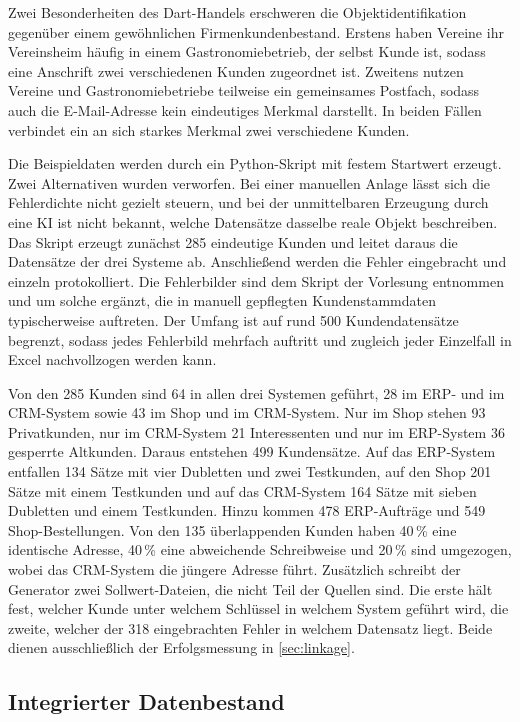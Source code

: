 \documentclass[a4paper,12pt]{article}
\begin{document}
Zwei Besonderheiten des Dart-Handels erschweren die Objektidentifikation gegenüber einem gewöhnlichen Firmenkundenbestand. Erstens haben Vereine ihr Vereinsheim häufig in einem Gastronomiebetrieb, der selbst Kunde ist, sodass eine Anschrift zwei verschiedenen Kunden zugeordnet ist. Zweitens nutzen Vereine und Gastronomiebetriebe teilweise ein gemeinsames Postfach, sodass auch die E-Mail-Adresse kein eindeutiges Merkmal darstellt. In beiden Fällen verbindet ein an sich starkes Merkmal zwei verschiedene Kunden.

Die Beispieldaten werden durch ein Python-Skript mit festem Startwert erzeugt. Zwei Alternativen wurden verworfen. Bei einer manuellen Anlage lässt sich die Fehlerdichte nicht gezielt steuern, und bei der unmittelbaren Erzeugung durch eine KI ist nicht bekannt, welche Datensätze dasselbe reale Objekt beschreiben. Das Skript erzeugt zunächst 285 eindeutige Kunden und leitet daraus die Datensätze der drei Systeme ab. Anschließend werden die Fehler eingebracht und einzeln protokolliert. Die Fehlerbilder sind dem Skript der Vorlesung entnommen und um solche ergänzt, die in manuell gepflegten Kundenstammdaten typischerweise auftreten. Der Umfang ist auf rund 500 Kundendatensätze begrenzt, sodass jedes Fehlerbild mehrfach auftritt und zugleich jeder Einzelfall in Excel nachvollzogen werden kann.

Von den 285 Kunden sind 64 in allen drei Systemen geführt, 28 im ERP- und im CRM-System sowie 43 im Shop und im CRM-System. Nur im Shop stehen 93 Privatkunden, nur im CRM-System 21 Interessenten und nur im ERP-System 36 gesperrte Altkunden. Daraus entstehen 499 Kundensätze. Auf das ERP-System entfallen 134 Sätze mit vier Dubletten und zwei Testkunden, auf den Shop 201 Sätze mit einem Testkunden und auf das CRM-System 164 Sätze mit sieben Dubletten und einem Testkunden. Hinzu kommen 478 ERP-Aufträge und 549 Shop-Bestellungen. Von den 135 überlappenden Kunden haben 40\,\% eine identische Adresse, 40\,\% eine abweichende Schreibweise und 20\,\% sind umgezogen, wobei das CRM-System die jüngere Adresse führt. Zusätzlich schreibt der Generator zwei Sollwert-Dateien, die nicht Teil der Quellen sind. Die erste hält fest, welcher Kunde unter welchem Schlüssel in welchem System geführt wird, die zweite, welcher der 318 eingebrachten Fehler in welchem Datensatz liegt. Beide dienen ausschließlich der Erfolgsmessung in \cref{sec:linkage}.

\subsection{Integrierter Datenbestand}\label{sec:zielschema}
\end{document}
